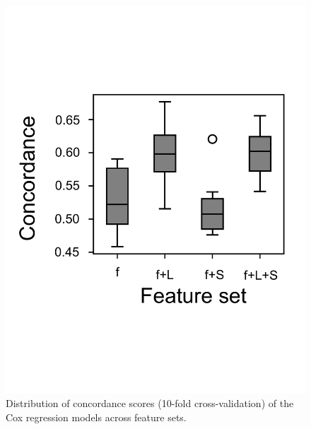 \begin{figure}[t!]
\centering
\includegraphics[width=0.8\columnwidth]{figures/survival_concordance_score_distribution.pdf}
\caption{Distribution of concordance scores (10-fold cross-validation) of the Cox regression models across feature sets.}
\label{fig:cox_regression_concordance_scores}
\end{figure}





